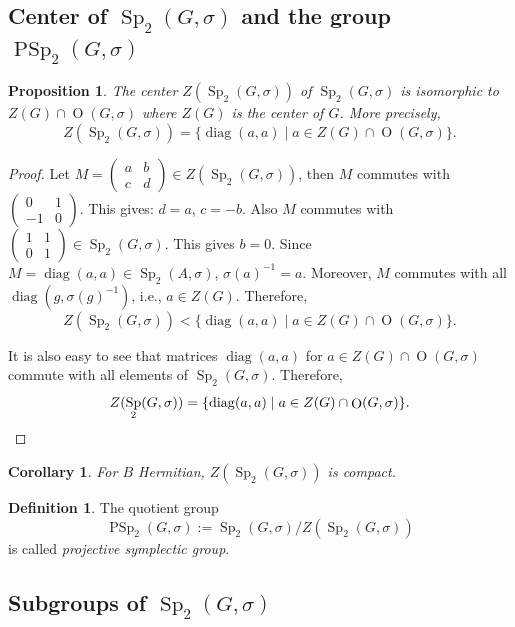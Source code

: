 \documentclass[a4paper,oneside,11pt]{amsart}
\DeclareMathOperator{\diag}{diag}
\DeclareMathOperator{\PSp}{PSp}
\DeclareMathOperator{\Sp}{Sp}
\DeclareMathOperator{\OO}{O}
\newcommand{\Om}{
\begin{pmatrix}
0 & 1\\
-1 & 0
\end{pmatrix}}
\theoremstyle{plain}
\newtheorem{cor}[teo]{Corollary}
\newtheorem{prop}[teo]{Proposition}
\theoremstyle{definition}
\newtheorem{df}[teo]{Definition}
\theoremstyle{remark}
\newcommand{\defin}{\emph}
\begin{document}
\subsection{Center of \texorpdfstring{$\Sp_2(G,\sigma)$}{Sp2(G,sigma)} and the group \texorpdfstring{$\PSp_2(G,\sigma)$}{PSp2(G,sigma)}}

\begin{prop}
The center $Z(\Sp_2(G,\sigma))$ of $\Sp_2(G,\sigma)$ is isomorphic to $Z(G)\cap \OO(G,\sigma)$ where $Z(G)$ is the center of $G$. More precisely,
$$Z(\Sp_2(G,\sigma))=\{\diag(a,a)\mid a\in Z(G)\cap \OO(G,\sigma)\}.$$
\end{prop}

\begin{proof}
Let $M=
\begin{pmatrix}
a & b \\
c & d
\end{pmatrix}\in Z(\Sp_2(G,\sigma))$, then $M$ commutes with $\Om$. This gives: $d=a$, $c=-b$. Also $M$ commutes with $\begin{pmatrix} 1 & 1 \\ 0 & 1\end{pmatrix}\in\Sp_2(G,\sigma)$. This gives $b=0$. Since $M=\diag(a,a)\in\Sp_2(A,\sigma)$, $\sigma(a)^{-1}=a$. Moreover, $M$ commutes with all $\diag(g,\sigma(g)^{-1})$, i.e., $a\in Z(G)$. Therefore,
$$Z(\Sp_2(G,\sigma))<\{\diag(a,a)\mid a\in Z(G)\cap \OO(G,\sigma)\}.$$

It is also easy to see that matrices $\diag(a,a)$ for $a\in Z(G)\cap \OO(G,\sigma)$ commute with all elements of $\Sp_2(G,\sigma)$. Therefore,
\begin{equation*}
    Z(\Sp_2(G,\sigma))=\{\diag(a,a)\mid a\in Z(G)\cap \OO(G,\sigma)\}.\qedhere    
\end{equation*}
\end{proof}

\begin{cor}
For $B$ Hermitian, $Z(\Sp_2(G,\sigma))$ is compact.
\end{cor}

\begin{df}
The quotient group
$$\PSp_2(G,\sigma):=\Sp_2(G,\sigma)/Z(\Sp_2(G,\sigma))$$
is called \defin{projective symplectic group}.
\end{df}

\subsection{Subgroups of \texorpdfstring{$\Sp_2(G,\sigma)$}{Sp2(G,sigma)}}
\end{document}
